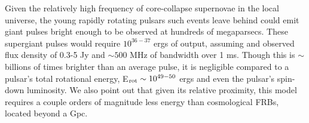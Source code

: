 \documentclass[useAMS,usenatbib]{mn2e}
\begin{document}
Given the relatively high frequency of core-collapse supernovae 
in the local universe, the young 
rapidly rotating pulsars such events leave behind could emit giant 
pulses bright enough to be observed at hundreds of megaparsecs. 
These supergiant pulses would require $10^{36 - 37}$ ergs of output,
assuming and observed flux density of 0.3-5 Jy and $\sim500$ 
MHz of bandwidth over 1 ms. Though this is $\sim$ billions of times
brighter than an average pulse, it is negligible compared to a 
pulsar's total rotational energy, E$_{\rm rot} \sim 10^{49-50}$ ergs and
even the pulsar's spin-down luminosity. We
also point out that given its relative proximity, this model requires
a couple orders of magnitude less energy than cosmological FRBs,
located beyond a Gpc. 

\end{document}
